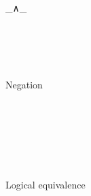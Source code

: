 \begin{code}
  \_∧\_\<%
\\
%
\\
\> \AgdaSymbol{:} \AgdaSymbol{(}  \AgdaSymbol{:} \AgdaSymbol{)}  \<%
\\
\>   \AgdaSymbol{=}    \AgdaBound{\_}  \AgdaSymbol{)}\<%
\\
%
\\
\>\<\end{code}

Negation

\begin{code}\>\<%
\\
%
\\
\>\AgdaFunction{\textasciitilde} \AgdaSymbol{:}   \<%
\\
\>\AgdaFunction{\textasciitilde}  \AgdaSymbol{=}    \<[13]%
\>[13]\<%
\\
%
\\
\>\<\end{code}

Logical equivalence

\begin{code}\>\<%
\\
%
\\
\> \<[6]%
\>[6]\AgdaSymbol{:} \AgdaSymbol{(}  \AgdaSymbol{:} \AgdaSymbol{)}  \<%
\\
\>   \AgdaSymbol{=} \AgdaSymbol{(}  \AgdaSymbol{)}  \AgdaSymbol{(}  \AgdaSymbol{)}\<%
\\
%
\\
\>\<\end{code}